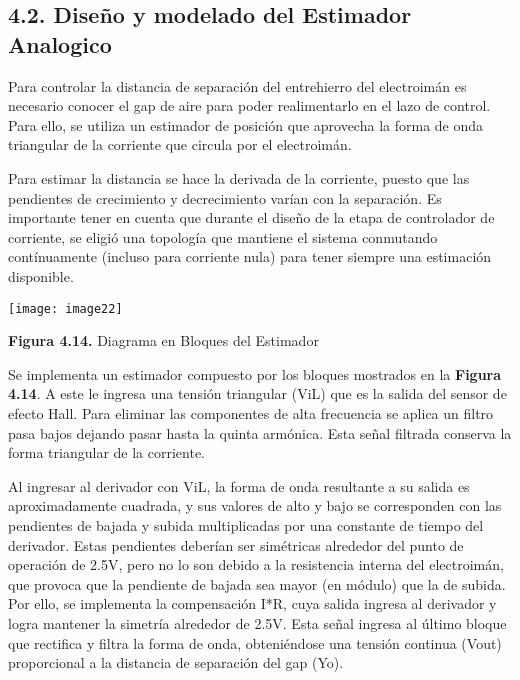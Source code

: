 \documentclass{article} %
\begin{document}
\subsection{4.2. Dise\~{n}o y modelado del Estimador Analogico}

\noindent Para controlar la distancia de separaci\'{o}n del entrehierro del electroim\'{a}n es necesario conocer el gap de aire para poder realimentarlo en el lazo de control.  Para ello, se utiliza un estimador de posici\'{o}n que aprovecha la forma de onda triangular de la corriente que circula por el electroim\'{a}n. 

\noindent 

\noindent Para estimar la distancia se hace la derivada de la corriente, puesto que las pendientes de crecimiento y decrecimiento var\'{i}an con la separaci\'{o}n. Es importante tener en cuenta que durante el dise\~{n}o de la etapa de controlador de corriente, se eligi\'{o} una topolog\'{i}a que mantiene el sistema conmutando cont\'{i}nuamente (incluso para corriente nula) para tener siempre una estimaci\'{o}n disponible.

   

\noindent \texttt{[image: image22]}

\noindent \textbf{Figura 4.14.} Diagrama en Bloques del Estimador

\noindent 

\noindent Se implementa un estimador compuesto por los bloques mostrados en la \textbf{Figura 4.14}. A este le ingresa una tensi\'{o}n triangular (ViL) que es la salida del sensor de efecto Hall. Para eliminar las componentes de alta frecuencia se aplica un filtro pasa bajos dejando pasar hasta la quinta arm\'{o}nica. Esta se\~{n}al filtrada conserva la forma triangular de la corriente. 

\noindent 

\noindent Al ingresar al derivador con ViL, la forma de onda resultante a su salida es aproximadamente cuadrada, y sus valores de alto y bajo se corresponden con las pendientes de bajada y subida multiplicadas por una constante de tiempo del derivador. Estas pendientes deber\'{i}an ser sim\'{e}tricas alrededor del punto de operaci\'{o}n de 2.5V, pero no lo son debido a la resistencia interna del electroim\'{a}n, que provoca que la pendiente de bajada sea mayor (en m\'{o}dulo) que la de subida. Por ello, se implementa la compensaci\'{o}n I*R, cuya salida ingresa al derivador y logra mantener la simetr\'{i}a alrededor de 2.5V. Esta se\~{n}al ingresa al \'{u}ltimo bloque que rectifica y filtra la forma de onda, obteni\'{e}ndose una tensi\'{o}n continua (Vout) proporcional a la distancia de separaci\'{o}n del gap (Yo).
\end{document}
